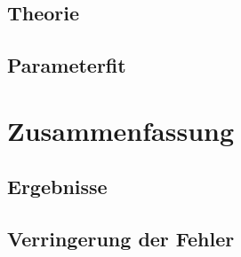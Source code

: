 \documentclass{../Misc/MontavonLaTeX/Montavon}
\begin{document}
\subsection{Theorie}

\subsection{Parameterfit}

\section{Zusammenfassung}
\subsection{Ergebnisse}

\subsection{Verringerung der Fehler}
\end{document}
